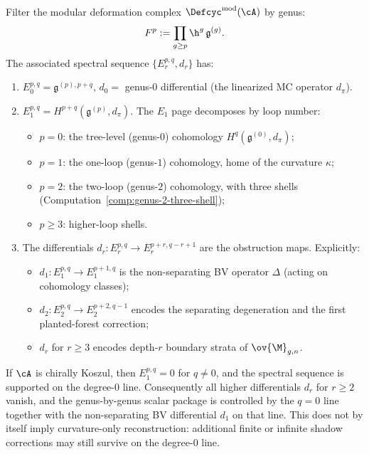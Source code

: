 \begin{construction}
Filter the modular deformation complex $\Defcyc^{\mathrm{mod}}(\cA)$ by genus:
\[
F^p := \prod_{g \geq p} \h^g \,\mathfrak{g}^{(g)}.
\]
The associated spectral sequence $\{E_r^{p,q}, d_r\}$ has:
\begin{enumerate}[label=\textup{(\roman*)}]
\item $E_0^{p,q} = \mathfrak{g}^{(p),p+q}$, $d_0 = $ genus-$0$ differential
 (the linearized MC operator $d_\pi$).
\item $E_1^{p,q} = H^{p+q}(\mathfrak{g}^{(p)}, d_\pi)$. The $E_1$ page
 decomposes by loop number:
 \begin{itemize}
 \item $p = 0$: the tree-level (genus-$0$) cohomology $H^q(\mathfrak{g}^{(0)}, d_\pi)$;
 \item $p = 1$: the one-loop (genus-$1$) cohomology, home of the curvature $\kappa$;
 \item $p = 2$: the two-loop (genus-$2$) cohomology, with three shells
 (Computation~\ref{comp:genus-2-three-shell});
 \item $p \geq 3$: higher-loop shells.
 \end{itemize}
\item The differentials $d_r: E_r^{p,q} \to E_r^{p+r,q-r+1}$ are the
 obstruction maps. Explicitly:
 \begin{itemize}
 \item $d_1: E_1^{p,q} \to E_1^{p+1,q}$ is the non-separating BV operator $\Delta$
 (acting on cohomology classes);
 \item $d_2: E_2^{p,q} \to E_2^{p+2,q-1}$ encodes the separating degeneration and the
 first planted-forest correction;
 \item $d_r$ for $r \geq 3$ encodes depth-$r$ boundary strata of $\ov{\M}_{g,n}$.
 \end{itemize}
\end{enumerate}
\end{construction}

\begin{theorem}
If $\cA$ is chirally Koszul, then $E_1^{p,q} = 0$ for $q \neq 0$, and the spectral
sequence is supported on the degree-$0$ line. Consequently all higher
differentials $d_r$ for $r \geq 2$ vanish, and the genus-by-genus scalar package is
controlled by the $q=0$ line together with the non-separating BV differential
$d_1$ on that line. This does not by itself imply curvature-only reconstruction:
additional finite or infinite shadow corrections may still survive on the
degree-$0$ line.
\end{theorem}

